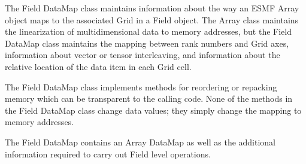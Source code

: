 

The Field DataMap class maintains information about the way an ESMF Array
object maps to the associated Grid in a Field object.  The Array class
maintains the linearization of multidimensional data to memory addresses,
but the Field DataMap class maintains the mapping between rank numbers and
Grid axes, information about vector or tensor interleaving, and information
about the relative location of the data item in each Grid cell.

The Field DataMap class implements methods for reordering or repacking
memory which can be transparent to the calling code.  None of the
methods in the Field DataMap class change data values; they simply
change the mapping to memory addresses. 

The Field DataMap contains an Array DataMap as well as the
additional information required to carry out Field level operations.


